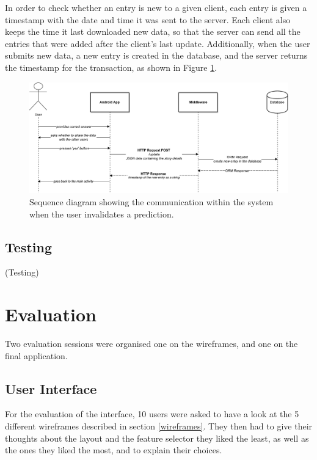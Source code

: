 \documentclass{mproj}
\begin{document}
In order to check whether an entry is new to a given client, each entry is given a timestamp with the date and time it was sent to the server. Each client also keeps the time it last downloaded new data, so that the server can send all the entries that were added after the client's last update. Additionally, when the user submits new data, a new entry is created in the database, and the server returns the timestamp for the transaction, as shown in Figure \ref{fig:new_entry}.
\begin{figure}[h]
	\centering
	\includegraphics[width=\textwidth]{images/wrong_prediction_diagram}
	\caption{Sequence diagram showing the communication within the system when the user invalidates a prediction.}
	\label{fig:new_entry}
\end{figure}

\section{Testing}

(Testing)

\chapter{Evaluation}\label{evaluation}

Two evaluation sessions were organised one on the wireframes, and one on the final application. 

\section{User Interface}

For the evaluation of the interface, 10 users were asked to have a look at the 5 different wireframes described in section \ref{wireframes}. They then had to give their thoughts about the layout and the feature selector they liked the least, as well as the ones they liked the most, and to explain their choices.
\end{document}
